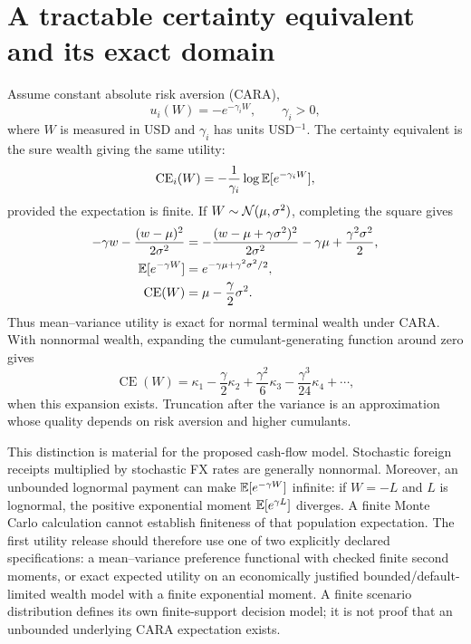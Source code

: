 \section{A tractable certainty equivalent and its exact domain}
Assume constant absolute risk aversion (CARA),
\begin{equation}
u_i(W)=-e^{-\gamma_iW},\qquad\gamma_i>0,
\end{equation}
where $W$ is measured in USD and $\gamma_i$ has units USD$^{-1}$. The certainty equivalent is the sure wealth giving the same utility:
\begin{equation}
\operatorname{CE}_i(W)=-\frac1{\gamma_i}\log\mathbb E[e^{-\gamma_iW}],
\label{eq:ce}
\end{equation}
provided the expectation is finite. If $W\sim\mathcal N(\mu,\sigma^2)$, completing the square gives
\begin{align}
-\gamma w-\frac{(w-\mu)^2}{2\sigma^2}
&=-\frac{(w-\mu+\gamma\sigma^2)^2}{2\sigma^2}
-\gamma\mu+\frac{\gamma^2\sigma^2}{2},\\
\mathbb E[e^{-\gamma W}]&=e^{-\gamma\mu+\gamma^2\sigma^2/2},\\
\operatorname{CE}(W)&=\mu-\frac{\gamma}{2}\sigma^2.
\label{eq:canormal}
\end{align}
Thus mean--variance utility is exact for normal terminal wealth under CARA. With nonnormal wealth, expanding the cumulant-generating function around zero gives
\begin{equation}
\operatorname{CE}(W)=\kappa_1-\frac\gamma2\kappa_2
+\frac{\gamma^2}{6}\kappa_3-\frac{\gamma^3}{24}\kappa_4+\cdots,
\end{equation}
when this expansion exists. Truncation after the variance is an approximation whose quality depends on risk aversion and higher cumulants.

This distinction is material for the proposed cash-flow model. Stochastic foreign receipts multiplied by stochastic FX rates are generally nonnormal. Moreover, an unbounded lognormal payment can make $\mathbb E[e^{-\gamma W}]$ infinite: if $W=-L$ and $L$ is lognormal, the positive exponential moment $\mathbb E[e^{\gamma L}]$ diverges. A finite Monte Carlo calculation cannot establish finiteness of that population expectation. The first utility release should therefore use one of two explicitly declared specifications: a mean--variance preference functional with checked finite second moments, or exact expected utility on an economically justified bounded/default-limited wealth model with a finite exponential moment. A finite scenario distribution defines its own finite-support decision model; it is not proof that an unbounded underlying CARA expectation exists.

